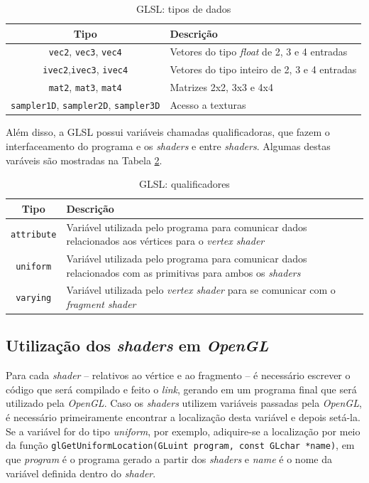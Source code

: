 \begin{table}[ht]
	\centering	
	\begin{tabularx}{0.9\textwidth}{cX}
		\toprule
		\textbf{Tipo} & \textbf{Descrição}  \\
		\midrule
		\texttt{vec2}, \texttt{vec3}, \texttt{vec4} & Vetores do tipo \textit{float} de 2, 3 e 4 entradas \\
		\texttt{ivec2},\texttt{ivec3}, \texttt{ivec4} & Vetores do tipo inteiro de 2, 3 e 4 entradas \\
		\texttt{mat2}, \texttt{mat3}, \texttt{mat4} & Matrizes 2x2, 3x3 e 4x4 \\
		\texttt{sampler1D}, \texttt{sampler2D}, \texttt{sampler3D} & Acesso a texturas \\
		\bottomrule
	\end{tabularx}
	\caption{ GLSL: tipos de dados}
	\label{tiposglsl}
\end{table}

	Além disso, a GLSL possui variáveis chamadas qualificadoras, que fazem o interfaceamento do programa e os \textit{shaders} e entre \textit{shaders}. Algumas destas varáveis são mostradas na Tabela \ref{tiposqualificadores}.

	\begin{table}[ht]
	\centering	
	\begin{tabularx}{0.9\textwidth}{cX}
		\toprule
		\textbf{Tipo} & \textbf{Descrição}  \\
		\midrule
		\texttt{attribute} &  Variável utilizada pelo programa para comunicar dados relacionados aos vértices para o \textit{vertex shader}\\
		\texttt{uniform} &  Variável utilizada pelo programa para comunicar dados relacionados com as primitivas para ambos os \textit{shaders} \\
		\texttt{varying} &  Variável utilizada pelo \textit{vertex shader} para se comunicar com o \textit{fragment shader} \\
		\bottomrule
	\end{tabularx}
	\caption{ GLSL: qualificadores}
	\label{tiposqualificadores}
	\end{table}

\subsection{Utilização dos \textit{shaders} em \textit{OpenGL}}

	Para cada \textit{shader} -- relativos ao vértice e ao fragmento -- é necessário escrever o código que será compilado e feito o \textit{link}, gerando em um programa final que será utilizado pela \textit{OpenGL}. Caso os \textit{shaders} utilizem variáveis passadas pela \textit{OpenGL}, é necessário primeiramente encontrar a localização desta variável e depois setá-la. Se a variável for do tipo \textit{uniform}, por exemplo, adiquire-se a localização por meio da função \texttt{glGetUniformLocation(GLuint program, const GLchar *name)}, em que \textit{program} é o programa gerado a partir dos \textit{shaders} e \textit{name} é o nome da variável definida dentro do \textit{shader}. 

